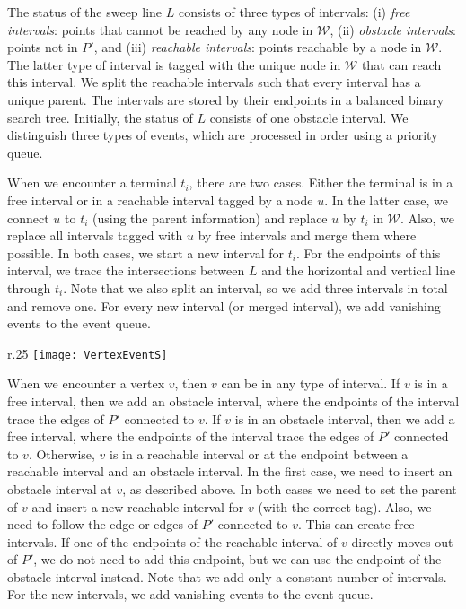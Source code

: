 \documentclass{journalA4}
\begin{document}
The status of the sweep line $L$ consists of three types of intervals: (i) \emph{free intervals}: points that cannot be reached by any node in
$\mathcal{W}$, (ii) \emph{obstacle intervals}: points not in $P'$, and (iii) \emph{reachable intervals}: points reachable by a node in $\mathcal{W}$. The latter type of interval is tagged with the unique node in $\mathcal{W}$ that can reach this interval. We split the reachable intervals such that every interval has a
unique parent. The intervals are stored by their endpoints in a balanced binary search tree. Initially, the status of $L$ consists of one obstacle interval. We distinguish three types of events, which are processed in order using a priority queue.

 When we encounter a terminal $t_i$, there are two cases. Either the terminal is in a free interval or in a reachable interval tagged by a node $u$. In the latter case, we connect $u$ to $t_i$ (using the parent information) and replace $u$ by $t_i$ in $\mathcal{W}$. Also, we replace all intervals tagged with $u$ by free intervals and merge them where possible. In both cases, we start a new interval for $t_i$. For the endpoints of this interval, we trace the intersections between $L$ and the horizontal and vertical line through $t_i$. Note that we also split an interval, so we add three intervals in total and remove one. For every new interval (or merged interval), we add vanishing events to the event queue.


\begin{wrapfigure}[8]{r}{.25\textwidth}
\centering
\texttt{[image: VertexEventS]}
\end{wrapfigure}
 When we encounter a vertex $v$, then $v$ can be in any type of interval. If $v$ is in a free interval, then we add an obstacle interval, where the endpoints of the interval trace the edges of $P'$ connected to $v$. If $v$ is in an obstacle interval, then we add a free interval, where the endpoints of the interval trace the edges of $P'$ connected to $v$. Otherwise, $v$ is in a reachable interval or at the endpoint between a reachable interval and an obstacle interval. In the first case, we need to insert an obstacle interval at $v$, as described above. In both cases we need to set the parent of $v$ and insert a new reachable interval for $v$ (with the correct tag). Also, we need to follow the edge or edges of $P'$ connected to $v$. This can create free intervals. If one of the endpoints of the reachable interval of $v$ directly moves out of $P'$, we do not need to add this endpoint, but we can use the endpoint of the obstacle interval instead. Note that we add only a constant number of intervals. For the new intervals, we add vanishing events to the event queue.
\end{document}

